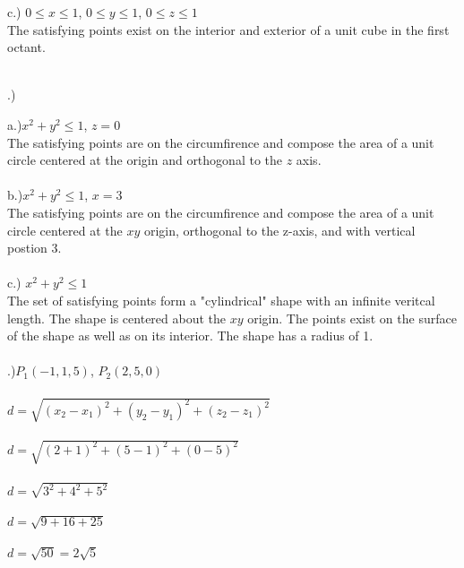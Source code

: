 \documentclass[12pt]{article}
\begin{document}
\noindent c.) $0 \leq x \leq 1$, \hspace{10pt} $0 \leq y \leq 1$, \hspace{10pt} $0 \leq z \leq 1$\\
The satisfying points exist on the interior and exterior of a unit cube in the first octant.\\\\ \pagebreak

.)

\noindent a.)$x^{2} + y^{2} \leq 1$, \hspace{10pt} $z = 0$\\
The satisfying points are on the circumfirence and compose the area of a unit circle centered at 
the origin and orthogonal to the $z$ axis.\\\\

\noindent b.)$x^{2} + y^{2} \leq 1$, \hspace{10pt} $x = 3$\\
The satisfying points are on the circumfirence and compose the area of a unit circle centered at the
$xy$ origin, orthogonal to the z-axis, and with vertical postion $3$.\\\\

\noindent c.) $x^{2} + y^{2} \leq 1$\\
The set of satisfying points form a "cylindrical" shape with an infinite veritcal length. The shape 
is centered about the $xy$ origin. The points exist on the surface of the shape as well as on its 
interior. The shape has a radius of 1. \\\\

.)$P_{1}(-1, 1, 5)$, \hspace{10pt} $P_{2}(2, 5, 0)$\\\\
$d = \sqrt{(x_{2} - x_{1})^{2} + (y_{2} - y_{1})^{2} + (z_{2} - z_{1})^{2}}$\\\\
$d = \sqrt{(2 + 1)^{2} + (5 - 1)^{2} + (0 - 5)^{2}}$\\\\
$d = \sqrt{3^{2} + 4^{2} + 5^{2}}$\\\\
$d = \sqrt{9 + 16 + 25}$\\\\
$d = \sqrt{50} = 2\sqrt{5}$\\\\
\end{document}
